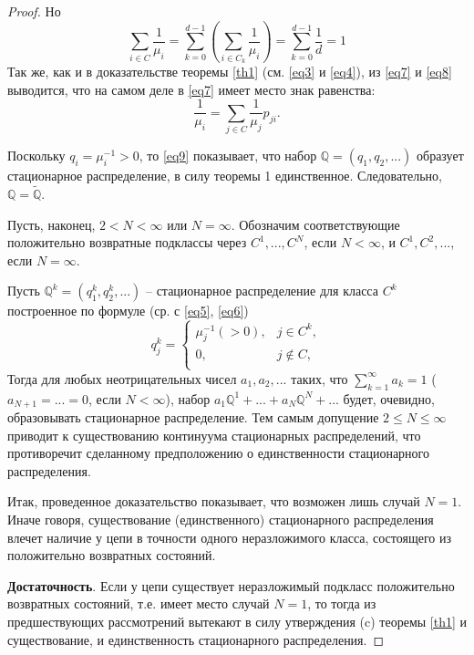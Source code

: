\begin{theorem}
\begin{proof}
Но
\begin{equation}\label{eq8}
\sum_{i \in C} \frac{1}{\mu_i} = \sum_{k = 0}^{d - 1} \left( \sum_{i \in C_k} \frac{1}{\mu_i} \right) = \sum_{k = 0}^{d - 1} \frac{1}{d} = 1
\end{equation}
Так же, как и в доказательстве теоремы \ref{th1} (см. \eqref{eq3} и \eqref{eq4}), из \eqref{eq7} и \eqref{eq8} выводится, что на самом деле в \eqref{eq7} имеет место знак равенства:
\begin{equation}\label{eq9}
\frac{1}{\mu_i} = \sum_{j \in C} \frac{1}{\mu_j} p_{ji}.
\end{equation}

Поскольку $q_i = \mu_i^{-1} > 0$, то \eqref{eq9} показывает, что набор $\mathbb{Q} = (q_1, q_2, ...)$ образует стационарное распределение, в силу теоремы 1 единственное. Следовательно, $\mathbb{Q} = \widetilde{\mathbb{Q}}$.

Пусть, наконец, $2 < N < \infty$ или $N = \infty$. Обозначим соответствующие положительно возвратные подклассы через $C^1, ..., C^N$, если $N < \infty$, и $C^1, C^2, ...$, если $N = \infty$.

Пусть $\mathbb{Q}^k = (q_1^k, q_2^k, ...)$ -- стационарное распределение для класса $C^k$ построенное по формуле (ср. с  \eqref{eq5}, \eqref{eq6})
$$
q_j^k =
  \begin{cases}
    \mu_j^{-1} (> 0), & j \in C^k,\\
    0, & j \notin C,\\
  \end{cases} 
$$
Тогда для любых неотрицательных чисел $a_1, a_2, ...$ таких, что $\sum_{k = 1}^{\infty} a_k = 1$ ($a_{N + 1} = ... = 0$, если $N < \infty$), набор $a_1 \mathbb{Q}^1 + ... + a_N \mathbb{Q}^N + ...$ будет, очевидно, образовывать стационарное распределение. Тем самым допущение $2 \leq N \leq \infty$ приводит к существованию континуума стационарных распределений, что противоречит сделанному предположению о единственности стационарного распределения.

Итак, проведенное доказательство показывает, что возможен лишь случай $N = 1$. Иначе говоря, существование (единственного) стационарного распределения влечет наличие у цепи в точности одного неразложимого класса, состоящего из положительно возвратных состояний.

\textbf{Достаточность}. Если у цепи существует неразложимый подкласс положительно возвратных состояний, т.е. имеет место случай $N = 1$, то тогда из предшествующих рассмотрений вытекают в силу утверждения (c) теоремы \ref{th1} и существование, и единственность стационарного распределения.

\end{proof}
\end{theorem}

